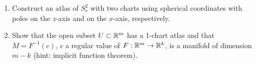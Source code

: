 \begin{exercises}
\begin{enumerate}[nosep]
\item Construct an atlas of $S^2_r$ with two charts using spherical coordinates with poles on the $z$-axis and on the $x$-axis, respectively.
\item Show that the open subset $U\subset\mathbb{R}^m$ has a 1-chart atlas and that $M=F^{-1}(c)$, $c$ a regular value of $F:\mathbb{R}^m\to\mathbb{R}^k$, is a manifold of dimension $m-k$ (hint: implicit function theorem).
\end{enumerate}
\end{exercises}
